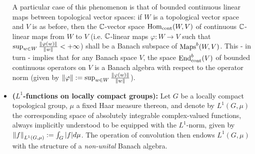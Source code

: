 \begin{example}
\begin{itemize}
                A particular case of this phenomenon is that of bounded continuous linear maps between topological vector spaces: if $W$ is a topological vector space and $V$ is as before, then the $\mathbb{C}$-vector space $\mathrm{Hom}_{\mathrm{cont}}(W, V)$ of continuous $\mathbb{C}$-linear maps from $W$ to $V$ (i.e. $\mathbb{C}$-linear maps $\varphi: W \to V$ such that $\sup_{w \in W} \frac{\left\| {\varphi(w)} \right\|}{\left\| {w} \right\|} < +\infty$) shall be a Banach subspace of $\mathrm{Maps}^b(W, V)$. This - in turn - implies that for any Banach space $V$, the space $\mathrm{End}_{\mathrm{cont}}^b(V)$ of bounded continuous operators on $V$ is a Banach algebra with respect to the operator norm (given by $\left\| {\varphi} \right\| := \sup_{w \in W} \frac{\left\| {\varphi(w)} \right\|}{\left\| {w} \right\|}$). 
                \item \textbf{($L^1$-functions on locally compact groups):} Let $G$ be a locally compact topological group, $\mu$ a fixed Haar measure thereon, and denote by $L^1(G, \mu)$ the corresponding space of absolutely integrable complex-valued functions, always implicitly understood to be equipped with the $L^1$-norm, given by $\left\| {f} \right\|_{L^1(G, \mu)} := \int_G |f| d\mu$. The operation of convolution then endows $L^1(G, \mu)$ with the structure of a \textit{non-unital} Banach algebra.
            \end{itemize}
        \end{example}
        
